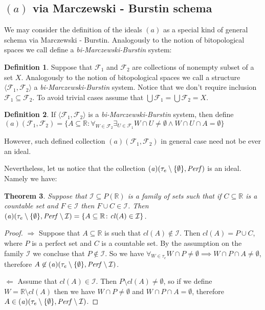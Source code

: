\documentclass[12pt]{amsart}
\theoremstyle{plain}
\newtheorem{theorem}{Theorem}[section]
\theoremstyle{definition}
\newtheorem{definition}[theorem]{Definition}
\theoremstyle{remark}
\newcommand{\cl}{\mathit{cl}}
\newcommand{\Perf}{{\it Perf}}
\newcommand{\real}{\mathbb{R}}
\newcommand{\cF}{{\mathcal F}}
\newcommand{\cI}{{\mathcal I}}
\newcommand{\aideal}{\mathit{(a)}}
\newcommand{\biMB}{bi-Marczewski-Burstin}
\begin{document}
\subsection{$\aideal$ via Marczewski - Burstin schema}

We may consider the definition of the ideals $\aideal$
as a special kind of general schema via Marczewski - Burstin.
Analogously to the notion of bitopological spaces we call define
a {\it\biMB{}} system:

\begin{definition}
Suppose that $\cF_1$ and $\cF_2$ are collections of nonempty
subset of a set $X$. 
Analogously to the notion of bitopological spaces we call a structure
$\langle \cF_1, \cF_2 \rangle$ a {\it\biMB{}} system.
Notice that we don't require inclusion $\cF_1 \subseteq \cF_2$.
To avoid trivial cases assume that $\bigcup \cF_1 = \bigcup \cF_2 = X$.
\end{definition}

\begin{definition}
If $\langle \cF_1, \cF_2 \rangle$ is a {\it\biMB{}} system,
then define 
$\aideal(\cF_1, \cF_2) = \lbrace A \subseteq \real\colon 
\forall_{W\in \cF_2} \exists_{U \in \cF_1}
W \cap U \not= \emptyset \wedge W \cap U \cap A = \emptyset
\rbrace$ 
\end{definition}

However, such defined collection $\aideal(\cF_1, \cF_2)$
in general case need not be ever an ideal.

Nevertheless, let us notice that the collection
$\aideal(\tau_e\setminus\lbrace\emptyset\rbrace, \Perf)$ is an ideal. Namely we have:

\begin{theorem}
\label{theorem:a_tau_e_perf_i}
Suppose that $\cI \subseteq P(\real)$ is a family of sets such that 
if $C\subseteq \real$ is a countable set and $F\in\cI$ then $F \cup C \in \cI$. 
Then $\aideal(\tau_e\setminus\lbrace\emptyset\rbrace, \Perf\setminus\cI) = \lbrace A \subseteq \real \colon \cl(A) \in \cI \rbrace$.
\end{theorem}

\begin{proof}
$\Rightarrow$ Suppose that $A\subseteq \real$ is such that $\cl(A) \not\in\cI$. Then $\cl(A) = P \cup C$, where $P$ is a perfect set and $C$ is a countable set. By the assumption on the family $\cI$ we concluse that $P\not\in\cI$. So we have $\forall_{W \in \tau_e} W \cap P \not= \emptyset \implies W \cap P \cap A \not= \emptyset$, therefore $A \not\in \aideal(\tau_e\setminus\lbrace\emptyset\rbrace, \Perf\setminus\cI)$.

$\Leftarrow$ Assume that $\cl(A)\in\cI$. Then $P \setminus \cl(A) \not=\emptyset$, so if we define $W = \real\setminus\cl(A)$ then we have $W \cap P \not= \emptyset$ and $W \cap P \cap A = \emptyset$, therefore  
$A \in \aideal(\tau_e\setminus\lbrace\emptyset\rbrace, \Perf\setminus\cI)$.
\end{proof}
\end{document}
